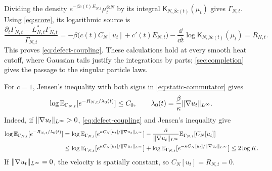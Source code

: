 \documentclass[11pt,reqno]{amsart}
\numberwithin{equation}{section}
\theoremstyle{plain}
\theoremstyle{remark}
\DeclarePairedDelimiter{\norm}{\lVert}{\rVert}
\newcommand{\E}{\mathbb E}\newcommand{\Q}{\mathbb Q}\newcommand{\Pb}{\mathbb P}
\newcommand{\K}{\mathsf K}\newcommand{\g}{\mathsf g}\newcommand{\Fr}{\mathsf F}
\begin{document}
Dividing the density $e^{-\beta c(t)E_{N,t}}\mu_t^{\otimes N}$ by its integral $\K_{N,\beta c(t)}(\mu_t)$ gives $\Gamma_{N,t}$. Using \eqref{eq:score}, its logarithmic source is
\begin{equation}
 \frac{\partial_t\Gamma_{N,t}-L_{N,t}^*\Gamma_{N,t}}{\Gamma_{N,t}} =-\beta\bigl(c(t)C_N[u_t]+c'(t)E_{N,t}\bigr) -\frac{\dd}{\dd t}\log\K_{N,\beta c(t)}(\mu_t) =R_{N,t}. \label{eq:static-normalized-defect}
\end{equation}
This proves \eqref{eq:defect-coupling}. These calculations hold at every smooth heat cutoff, where Gaussian tails justify the integrations by parts; \cref{sec:completion} gives the passage to the singular particle laws.

For $c=1$, Jensen's inequality with both signs in \eqref{eq:static-commutator} gives
\begin{equation}\label{eq:scalar-defect}
 \log\E_{\Gamma_{N,t}}[e^{-R_{N,t}/\lambda_0(t)}]\le C_0,
              \qquad\lambda_0(t)=\frac\beta\kappa\norm{\nabla u_t}_{L^\infty}.
\end{equation}
Indeed, if $\norm{\nabla u_t}_{L^\infty}>0$, \eqref{eq:defect-coupling} and Jensen's inequality give
\begin{align}
 \log\E_{\Gamma_{N,t}}[e^{-R_{N,t}/\lambda_0(t)}]
 &=\log\E_{\Gamma_{N,t}}[e^{\kappa C_N[u_t]/\norm{\nabla u_t}_{L^\infty}}]
       -\frac{\kappa}{\norm{\nabla u_t}_{L^\infty}}\E_{\Gamma_{N,t}}[C_N[u_t]]\notag\\
 &\le\log\E_{\Gamma_{N,t}}[e^{\kappa C_N[u_t]/\norm{\nabla u_t}_{L^\infty}}]
       +\log\E_{\Gamma_{N,t}}[e^{-\kappa C_N[u_t]/\norm{\nabla u_t}_{L^\infty}}]
 \le2\log K.
 \label{eq:static-defect-exponential-calculation}
\end{align}
If $\norm{\nabla u_t}_{L^\infty}=0$, the velocity is spatially constant, so $C_N[u_t]=R_{N,t}=0$.
\end{document}
